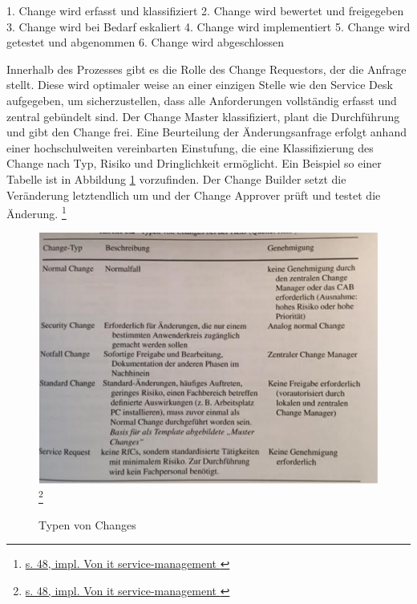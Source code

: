 \documentclass[a4paper, 12pt]{scrreprt}
\begin{document}
1.	Change wird erfasst und klassifiziert
2.	Change wird bewertet und freigegeben
3.	Change wird bei Bedarf eskaliert
4.	Change wird implementiert
5.	Change wird getestet und abgenommen
6.	Change wird abgeschlossen

Innerhalb des Prozesses gibt es die Rolle des Change Requestors, der die Anfrage stellt. Diese wird optimaler weise an einer einzigen Stelle wie den Service Desk aufgegeben, um sicherzustellen, dass alle Anforderungen vollständig erfasst und zentral gebündelt sind. Der Change Master klassifiziert, plant die Durchführung und gibt den Change frei. Eine Beurteilung der Änderungsanfrage erfolgt anhand einer hochschulweiten vereinbarten Einstufung, die eine Klassifizierung des Change nach Typ, Risiko und Dringlichkeit ermöglicht. Ein Beispiel so einer Tabelle ist in Abbildung \ref{tvc} vorzufinden. Der Change Builder setzt die Veränderung letztendlich um und der Change Approver prüft und testet die Änderung. \footnote{\url{s. 48, impl. Von it service-management }}
 
\begin{figure}[h!]
	\centering
	\includegraphics[width=15cm]{bilder_olli/typen_von_changes}  \footnote{\url{s. 48, impl. Von it service-management }}
	\caption{Typen von Changes}
	\label{tvc}
\end{figure}
\end{document}
